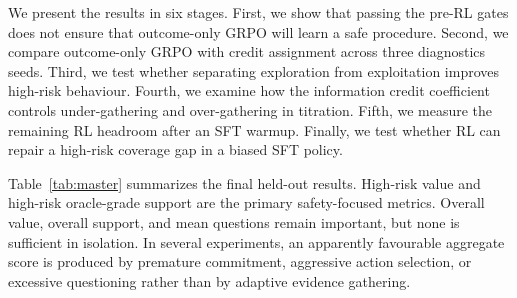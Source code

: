 \documentclass{article}
\begin{document}
We present the results in six stages. First, we show that passing the pre-RL gates
does not ensure that outcome-only GRPO will learn a safe procedure. Second, we
compare outcome-only GRPO with credit assignment across three diagnostics seeds.
Third, we test whether separating exploration from exploitation improves high-risk
behaviour. Fourth, we examine how the information credit coefficient controls
under-gathering and over-gathering in titration. Fifth, we measure the remaining
RL headroom after an SFT warmup. Finally, we test whether RL can repair a high-risk
coverage gap in a biased SFT policy.

Table~\ref{tab:master} summarizes the final held-out results. High-risk value and
high-risk oracle-grade support are the primary safety-focused metrics. Overall
value, overall support, and mean questions remain important, but none is
sufficient in isolation. In several experiments, an apparently favourable
aggregate score is produced by premature commitment, aggressive action selection,
or excessive questioning rather than by adaptive evidence gathering.
\end{document}
